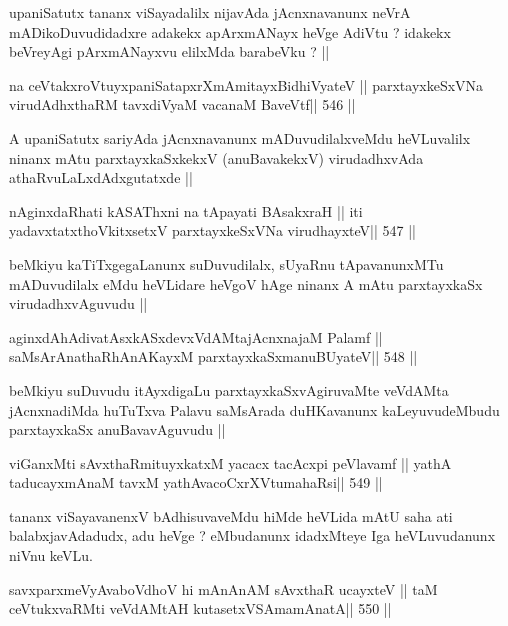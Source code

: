 \begin{artha}
upaniSatutx tananx viSayadalilx nijavAda jAcnxnavanunx neVrA
mADikoDuvudidadxre adakekx apArxmANayx heVge AdiVtu ? idakekx
beVreyAgi pArxmANayxvu elilxMda barabeVku ? ||
\end{artha}

\begin{shl}
na ceVtakxroVtuyxpaniSatapxrXmAmitayxBidhiVyateV ||
parxtayxkeSxVNa virudAdhxthaRM tavxdiVyaM vacanaM BaveVtf\hfill || 546 ||
\end{shl}

\begin{artha}
A upaniSatutx sariyAda jAcnxnavanunx mADuvudilalxveMdu heVLuvalilx
ninanx mAtu parxtayxkaSxkekxV (anuBavakekxV) virudadhxvAda
athaRvuLaLxdAdxgutatxde ||
\end{artha}

\begin{shl}
nAginxdaRhati kASAThxni na tApayati BAsakxraH ||
iti yadavxtatxthoVkitxsetxV parxtayxkeSxVNa virudhayxteV\hfill || 547 ||
\end{shl}

\begin{artha}
beMkiyu kaTiTxgegaLanunx suDuvudilalx, sUyaRnu tApavanunxMTu
mADuvudilalx eMdu heVLidare heVgoV hAge ninanx A mAtu parxtayxkaSx
virudadhxvAguvudu ||
\end{artha}

\begin{shl}
aginxdAhAdivatAsxkASxdevxVdAMtajAcnxnajaM Palamf ||
saMsArAnathaRhAnAKayxM parxtayxkaSxmanuBUyateV\hfill || 548 ||
\end{shl}

\begin{artha}
beMkiyu suDuvudu itAyxdigaLu parxtayxkaSxvAgiruvaMte veVdAMta
jAcnxnadiMda huTuTxva Palavu saMsArada duHKavanunx kaLeyuvudeMbudu
parxtayxkaSx anuBavavAguvudu ||
\end{artha}

\begin{shl}
viGanxMti sAvxthaRmituyxkatxM yacacx tacAcxpi peVlavamf ||
yathA taducayxmAnaM tavxM yathAvacoCxrXVtumahaRsi\hfill || 549 ||
\end{shl}

\begin{artha}
tananx viSayavanenxV bAdhisuvaveMdu hiMde heVLida mAtU saha ati
balabxjavAdadudx, adu heVge ? eMbudanunx idadxMteye Iga heVLuvudanunx
niVnu keVLu.
\end{artha}

\begin{shl}
savxparxmeVyAvaboVdhoV hi mAnAnAM sAvxthaR ucayxteV ||
taM ceVtukxvaRMti veVdAMtAH kutasetxVSAmamAnatA\hfill || 550 ||
\end{shl}

